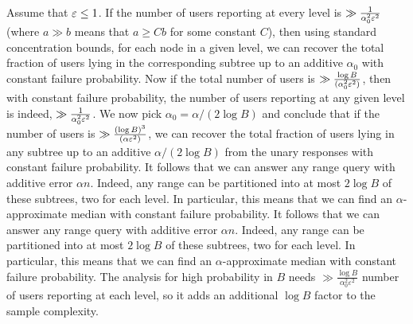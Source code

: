 Assume that $\varepsilon\leq 1$. If the number of users reporting at every level is $\gg \frac{1}{\alpha_0^2\varepsilon^2}$ (where $a\gg b$ means that $a\geq C b$ for some constant $C$), then using standard concentration bounds, for each node in a given level, we can recover the total fraction of users lying in the corresponding subtree up to an additive $\alpha_0$ with constant failure probability. Now if the total number of users is $\gg \frac{\log B}{(\alpha_0^2\varepsilon^2)}$, then with constant failure probability, the number of users reporting at any given level is indeed, $\gg \frac{1}{\alpha_0^2\varepsilon^2}$. We now pick $\alpha_0=\alpha/(2\log B)$ and conclude that if the number of users is $\gg \frac{(\log B)^3}{(\alpha\varepsilon^2)}$, we can recover the total fraction of users lying in any subtree up to an additive $\alpha/(2\log B)$ from the unary responses with constant failure probability. 
It follows that we can answer any range query with additive error $\alpha n$. Indeed, any range can be partitioned into at most $2\log B$ of these subtrees, two for each level. In particular, this means that we can find an $\alpha$-approximate median with constant failure probability.
It follows that we can answer any range query with additive error $\alpha n$. Indeed, any range can be partitioned into at most $2\log B$ of these subtrees, two for each level. In particular, this means that we can find an $\alpha$-approximate median with constant failure probability.
The analysis for high probability in $B$ needs $\gg \frac{\log B}{\alpha_0^2\varepsilon^2}$ number of users reporting at each level, so it adds an additional $\log B$ factor to the sample complexity.


%

